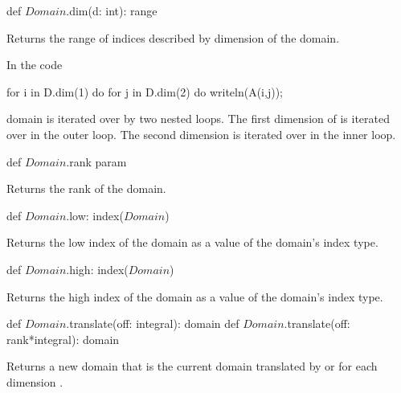 \begin{protohead}
def $Domain$.dim(d: int): range
\end{protohead}
\begin{protobody}
Returns the range of indices described by dimension  of the
domain.
\end{protobody}

\begin{example}
In the code
\begin{chapel}
for i in D.dim(1) do
  for j in D.dim(2) do
    writeln(A(i,j));
\end{chapel}
domain  is iterated over by two nested loops.  The first
dimension of  is iterated over in the outer loop.  The second
dimension is iterated over in the inner loop.
\end{example}


\begin{protohead}
def $Domain$.rank param
\end{protohead}
\begin{protobody}
Returns the rank of the domain.
\end{protobody}

\begin{protohead}
def $Domain$.low: index($Domain$)
\end{protohead}
\begin{protobody}
Returns the low index of the domain as a value of the domain's index
type.
\end{protobody}

\begin{protohead}
def $Domain$.high: index($Domain$)
\end{protohead}
\begin{protobody}
Returns the high index of the domain as a value of the domain's index
type.
\end{protobody}

\begin{protohead}
def $Domain$.translate(off: integral): domain
def $Domain$.translate(off: rank*integral): domain
\end{protohead}
\begin{protobody}
Returns a new domain that is the current domain translated
by  or  for each dimension .
\end{protobody}

